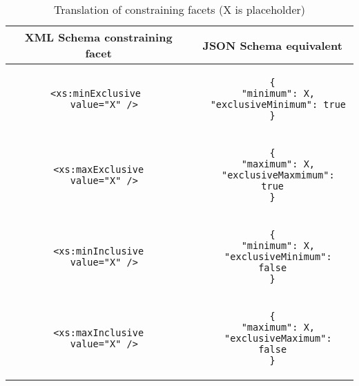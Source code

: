 \lstset{
  frame=none,
  numbers=none
}
\begin{longtable}{c|c}
\caption[Translation of constraining facets]{Translation of constraining facets \small{(X is placeholder)}}
\label{tbl:rules:facets}\\

\textbf{XML Schema constraining facet} & \textbf{JSON Schema equivalent}\\
\hline

\begin{minipage}{.4\textwidth}
  \begin{lstlisting}
<xs:minExclusive 
  value="X" />
  \end{lstlisting}
\end{minipage} &
\begin{minipage}{.55\textwidth}
\begin{lstlisting}
{
  "minimum": X,
  "exclusiveMinimum": true
}
\end{lstlisting}
\end{minipage}\\

\hline
\begin{minipage}{.4\textwidth}
  \begin{lstlisting}
<xs:maxExclusive
  value="X" />
  \end{lstlisting}
\end{minipage} &
\begin{minipage}{.55\textwidth}
\begin{lstlisting}
{
  "maximum": X,
  "exclusiveMaxmimum": true
}
\end{lstlisting}
\end{minipage}\\

\hline
\begin{minipage}{.4\textwidth}
  \begin{lstlisting}
<xs:minInclusive
  value="X" />
  \end{lstlisting}
\end{minipage} &
\begin{minipage}{.55\textwidth}
\begin{lstlisting}
{
  "minimum": X,
  "exclusiveMinimum": false
}
\end{lstlisting}
\end{minipage}\\

\hline
\begin{minipage}{.4\textwidth}
  \begin{lstlisting}
<xs:maxInclusive
  value="X" />
  \end{lstlisting}
\end{minipage} &
\begin{minipage}{.55\textwidth}
\begin{lstlisting}
{
  "maximum": X,
  "exclusiveMaximum": false
}
\end{lstlisting}
\end{minipage}\\


\end{longtable}
